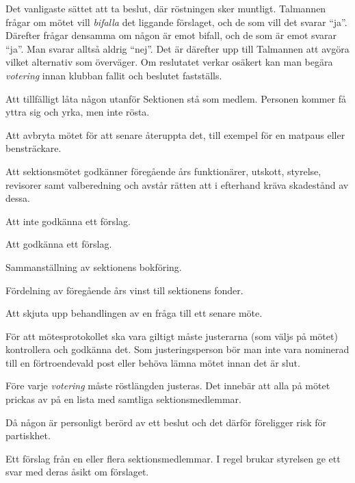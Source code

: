 \documentclass[../_main/handlingar.tex]{subfiles}
\begin{document}
\begin{description}[style=multiline, leftmargin=45mm]
    \item[Acklamation]
    Det vanligaste sättet att ta beslut, där röstningen sker muntligt. Talmannen frågar om mötet vill \emph{bifalla} det liggande förslaget, och de som vill det svarar ``ja''. Därefter frågar densamma om någon är emot bifall, och de som är emot svarar ``ja''. Man svarar alltså aldrig ``nej''. Det är därefter upp till Talmannen att avgöra vilket alternativ som överväger. Om reslutatet verkar osäkert kan man begära \emph{votering} innan klubban fallit och beslutet fastställs.
    \item[Adjungera]
    Att tillfälligt låta någon utanför Sektionen stå som medlem. Personen kommer få yttra sig och yrka, men inte rösta.
    \item[Ajournera]
    Att avbryta mötet för att senare återuppta det, till exempel för en matpaus eller bensträckare.
    \item[Ansvarsfrihet]
    Att sektionsmötet godkänner föregående års funktionärer, utskott, styrelse, revisorer samt valberedning och avstår rätten att i efterhand kräva skadestånd av dessa.
    \item[Avslag]
    Att inte godkänna ett förslag.
    \item[Bifall]
    Att godkänna ett förslag.
    \item[Bokslut]
    Sammanställning av sektionens bokföring.
    \item[Bokslutsdisposition]
    Fördelning av föregående års vinst till sektionens fonder.
    \item[Bordläggning]
    Att skjuta upp behandlingen av en fråga till ett senare möte.
    \item[Justering av protokoll]
    För att mötesprotokollet ska vara giltigt måste justerarna (som väljs på mötet) kontrollera och godkänna det. Som justeringsperson bör man inte vara nominerad till en förtroendevald post eller behöva lämna mötet innan det är slut.
    \item[Justering av röstlängd]
    Före varje \emph{votering} måste röstlängden justeras. Det innebär att alla på mötet prickas av på en lista med samtliga sektionsmedlemmar.
    \item[Jäv]
    Då någon är personligt berörd av ett beslut och det därför föreligger risk för partiskhet.
    \item[Motion]
    Ett förslag från en eller flera sektionsmedlemmar. I regel brukar styrelsen ge ett svar med deras åsikt om förslaget.

\end{description}
\end{document}
